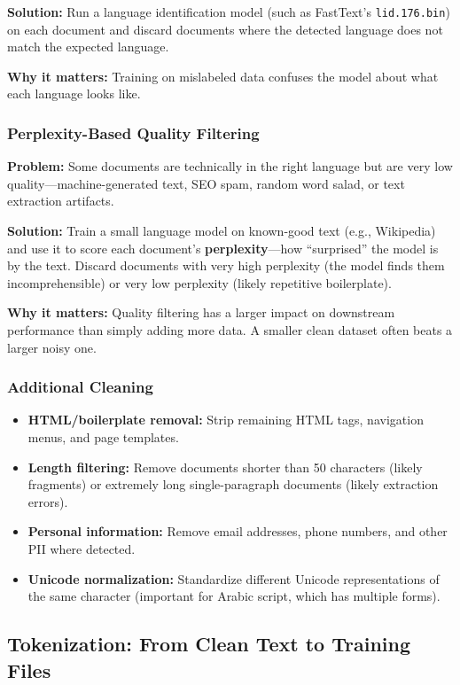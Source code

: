 \documentclass[11pt,a4paper]{article}
\begin{document}
\textbf{Solution:} Run a language identification model (such as FastText's \texttt{lid.176.bin}) on each document and discard documents where the detected language does not match the expected language.

\textbf{Why it matters:} Training on mislabeled data confuses the model about what each language looks like.

\subsubsection{Perplexity-Based Quality Filtering}

\textbf{Problem:} Some documents are technically in the right language but are very low quality---machine-generated text, SEO spam, random word salad, or text extraction artifacts.

\textbf{Solution:} Train a small language model on known-good text (e.g., Wikipedia) and use it to score each document's \textbf{perplexity}---how ``surprised'' the model is by the text. Discard documents with very high perplexity (the model finds them incomprehensible) or very low perplexity (likely repetitive boilerplate).

\textbf{Why it matters:} Quality filtering has a larger impact on downstream performance than simply adding more data. A smaller clean dataset often beats a larger noisy one.

\subsubsection{Additional Cleaning}

\begin{itemize}
    \item \textbf{HTML/boilerplate removal:} Strip remaining HTML tags, navigation menus, and page templates.
    \item \textbf{Length filtering:} Remove documents shorter than 50 characters (likely fragments) or extremely long single-paragraph documents (likely extraction errors).
    \item \textbf{Personal information:} Remove email addresses, phone numbers, and other PII where detected.
    \item \textbf{Unicode normalization:} Standardize different Unicode representations of the same character (important for Arabic script, which has multiple forms).
\end{itemize}

\subsection{Tokenization: From Clean Text to Training Files}
\end{document}
